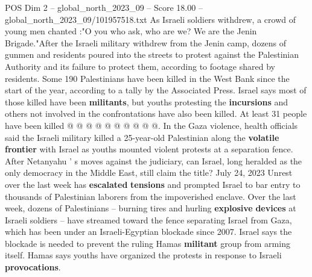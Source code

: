 \begin{textsample}{POS Dim 2 – global\_north\_2023\_09 – Score 18.00 – global\_north\_2023\_09/101957518.txt}
As Israeli soldiers withdrew, a crowd of young men chanted :"O you who ask, who are we?
We are the Jenin Brigade."After the Israeli military withdrew from the Jenin camp, dozens of gunmen and residents poured into the streets to protest against the Palestinian Authority and its failure to protect them, according to footage shared by residents.
Some 190 Palestinians have been killed in the West Bank since the start of the year, according to a tally by the Associated Press.
Israel says most of those killed have been \textbf{militants}, but youths protesting the \textbf{incursions} and others not involved in the confrontations have also been killed.
At least 31 people have been killed @ @ @ @ @ @ @ @ @ @.
In the Gaza violence, health officials said the Israeli military killed a 25-year-old Palestinian along the \textbf{volatile} \textbf{frontier} with Israel as youths mounted violent protests at a separation fence.
After Netanyahu ' s moves against the judiciary, can Israel, long heralded as the only democracy in the Middle East, still claim the title?
July 24, 2023 Unrest over the last week has \textbf{escalated} \textbf{tensions} and prompted Israel to bar entry to thousands of Palestinian laborers from the impoverished enclave.
Over the last week, dozens of Palestinians -- burning tires and hurling \textbf{explosive} \textbf{devices} at Israeli soldiers -- have streamed toward the fence separating Israel from Gaza, which has been under an Israeli-Egyptian blockade since 2007.
Israel says the blockade is needed to prevent the ruling Hamas \textbf{militant} group from arming itself.
Hamas says youths have organized the protests in response to Israeli \textbf{provocations}.

\end{textsample}
